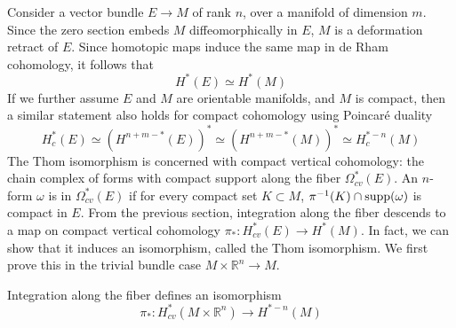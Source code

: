 Consider a vector bundle $E\to M$ of rank  $n$, over a manifold of dimension $m$. 
Since the zero section embeds
$M$ diffeomorphically in  $E$, $M$ is a deformation retract of  $E$. Since
homotopic maps induce the same map in de Rham cohomology, it follows that
\[
H^*(E) \simeq H^*(M)
\] 
If we further assume $E$ and  $M$ are orientable manifolds, and $M$ is
compact, then a similar statement also holds for compact cohomology using 
Poincar\'e duality %
\[
H^*_c(E) \simeq (H^{n+m-*}(E))^* \simeq (H^{n+m-*}(M))^* \simeq H^{*-n}_c(M)
\] 
The Thom isomorphism is concerned with compact vertical cohomology: the chain
complex of forms with compact support along the fiber $\Omega_{cv}^*(E)$. An
$n$-form  $\omega$ is in $\Omega_{cv}^*(E)$ if for every compact set $K \subset M$, 
$\pi^{-1}(K)\cap \operatorname{supp}(\omega)$ is compact in $E$. 
From the previous section, integration along the fiber descends to a map 
on compact vertical cohomology
$\pi_* : H_{cv}^*(E) \to H^*(M)$. In fact, we can show that it induces an
isomorphism, called the Thom isomorphism.
We first prove this in the trivial bundle case $M\times \mathbb{R}^n \to M$.
\begin{prop} %
	Integration along the fiber defines an isomorphism
	\[
	\pi_* : H_{cv}^*(M\times \mathbb{R}^n) \to H^{*-n}(M)
	\] 
\end{prop}
